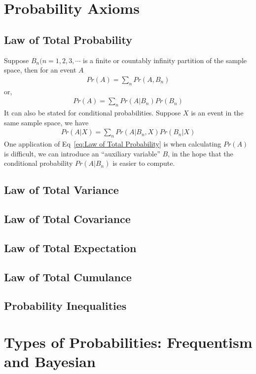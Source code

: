 \section{Probability Axioms}
\subsection{Law of Total Probability}
Suppose $B_n (n=1,2,3,\cdots$ is a finite or countably infinity partition of the sample space, then for an event $A$
\begin{align}
	Pr(A) = \sum_n Pr(A,B_n)
\end{align}
or,
\begin{align}\label{eq:Law of Total Probability}
	Pr(A) = \sum_n Pr(A|B_n) Pr(B_n)
\end{align}
It can also be stated for conditional probabilities. Suppose $X$ is an event in the same sample space, we have
\begin{align}
	Pr(A|X) = \sum_n Pr(A|B_n,X)Pr(B_n|X)
\end{align}
One application of Eq~\ref{eq:Law of Total Probability} is when calculating $Pr(A)$ is difficult, we can introduce an ``auxiliary variable'' $B$, in the hope that the conditional probability $Pr(A|B_n)$ is easier to compute.
\subsection{Law of Total Variance}
\subsection{Law of Total Covariance}
\subsection{Law of Total Expectation}
\subsection{Law of Total Cumulance}
\subsection{Probability Inequalities}

\section{Types of Probabilities: Frequentism and Bayesian} 